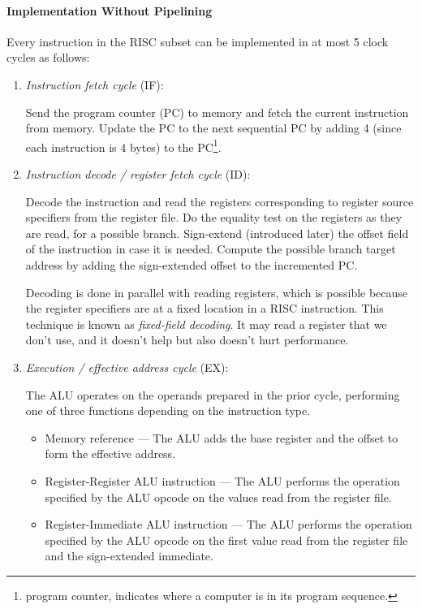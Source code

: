 \documentclass[12pt, a4paper]{article}
\theoremstyle{margin}
\begin{document}
	  \paragraph{Implementation Without Pipelining\cite{caqa}} 
		Every instruction in the RISC subset can be implemented in at most 5 clock cycles as follows:
		\begin{enumerate}
		  \item \emph{Instruction fetch cycle} (IF):

		  Send the program counter (PC) to memory and fetch the current instruction from memory. Update the PC to the next sequential PC by adding 4 (since each instruction is 4 bytes) to the PC\footnote{program counter, indicates where a computer is in its program sequence.}.

		  \item \emph{Instruction decode / register fetch cycle} (ID):

		  Decode the instruction and read the registers corresponding to register source specifiers from the register file. Do the equality test on the registers as they are read, for a possible branch. Sign-extend (introduced later) the offset field of the instruction in case it is needed. Compute the possible branch target address by adding the sign-extended offset to the incremented PC.

		  Decoding is done in parallel with reading registers, which is possible because the register specifiers are at a fixed location in a RISC instruction. This technique is known as \emph{fixed-field decoding}. It may read a register that we don't use, and it doesn't help but also doesn't hurt performance.

		  \item \emph{Execution / effective address cycle} (EX):

		  The ALU operates on the operands prepared in the prior cycle, performing one of three functions depending on the instruction type.
		  \begin{itemize}
			\item Memory reference --- The ALU adds the base register and the offset to form the effective address.
			\item Register-Register ALU instruction --- The ALU performs the operation specified by the ALU opcode on the values read from the register file.
			\item Register-Immediate ALU instruction --- The ALU performs the operation specified by the ALU opcode on the first value read from the register file and the sign-extended immediate.
		  \end{itemize}


\end{enumerate}
\end{document}
